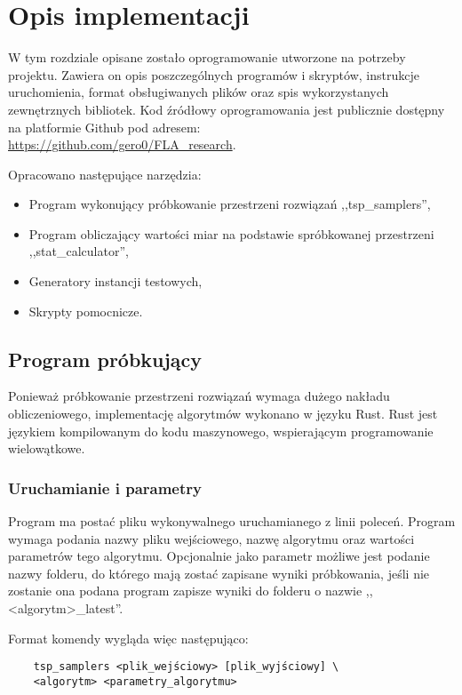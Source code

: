 \chapter{Opis implementacji}
W tym rozdziale opisane zostało oprogramowanie utworzone na potrzeby projektu.
Zawiera on opis poszczególnych programów i skryptów, instrukcje uruchomienia, format obsługiwanych plików oraz
spis wykorzystanych zewnętrznych bibliotek.
Kod źródłowy oprogramowania jest publicznie dostępny na platformie Github pod adresem: \\
\url{https://github.com/gero0/FLA_research}.

Opracowano następujące narzędzia:
\begin{itemize}
    \item Program wykonujący próbkowanie przestrzeni rozwiązań ,,tsp\_samplers'',
    \item Program obliczający wartości miar na podstawie spróbkowanej przestrzeni ,,stat\_calculator'',
    \item Generatory instancji testowych,
    \item Skrypty pomocnicze.
\end{itemize}

\section{Program próbkujący}
Ponieważ próbkowanie przestrzeni rozwiązań wymaga dużego nakładu obliczeniowego,
implementację algorytmów wykonano w języku Rust.
Rust jest językiem kompilowanym do kodu maszynowego, wspierającym programowanie wielowątkowe.

\subsection{Uruchamianie i parametry}

Program ma postać pliku wykonywalnego uruchamianego z linii poleceń.
Program wymaga podania nazwy pliku wejściowego, nazwę algorytmu oraz wartości parametrów tego algorytmu.
Opcjonalnie jako parametr możliwe jest podanie nazwy folderu, do którego mają zostać zapisane wyniki próbkowania,
jeśli nie zostanie ona podana program zapisze wyniki do folderu o nazwie ,,<algorytm>\_latest''.

Format komendy wygląda więc następująco:
\begin{lstlisting}
    tsp_samplers <plik_wejściowy> [plik_wyjściowy] \
    <algorytm> <parametry_algorytmu>
\end{lstlisting}


